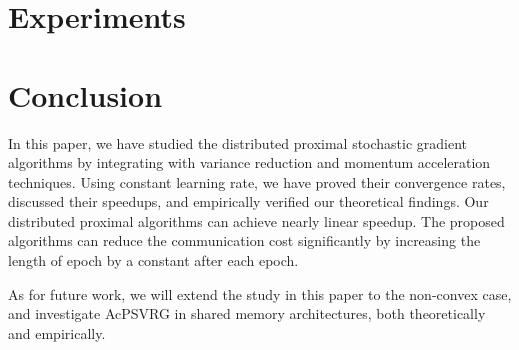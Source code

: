 \documentclass[conference]{IEEEtran}
\theoremstyle{definition}
\theoremstyle{remark}
\begin{document}
\section{Experiments}
%


\section{Conclusion}
In this paper, we have studied the distributed proximal stochastic gradient algorithms by integrating with variance reduction and momentum acceleration techniques. Using constant learning rate, we have proved their convergence rates, discussed their speedups, and empirically verified our theoretical findings. Our distributed proximal algorithms can achieve nearly linear speedup. The proposed algorithms can reduce the communication cost significantly by increasing the length of epoch by a constant after each epoch.

As for future work, we will extend the study in this paper to the non-convex case, and investigate AcPSVRG in shared memory architectures, both theoretically and empirically.

{\footnotesize


}

\appendices
\end{document}
